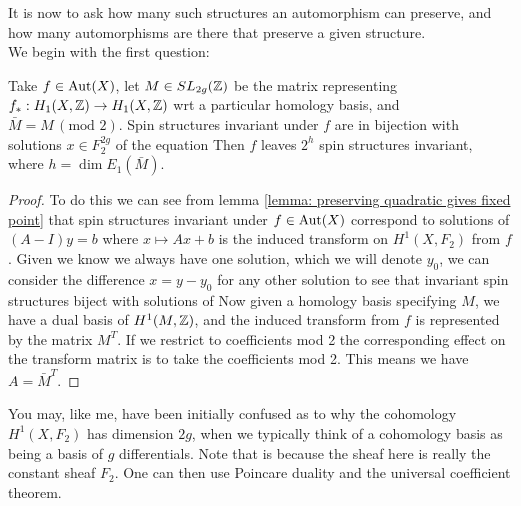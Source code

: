 \documentclass{article}
\begin{document}
It is now to ask how many such structures an automorphism can preserve, and how many automorphisms are there that preserve a given structure.\\
We begin with the first question:
\begin{theorem}
	Take $f \in \operatorname{Aut}(X)$, let $M \in SL_{2g}(\mathbb{Z})$ be the matrix representing $f_\ast : H_1(X,\mathbb{Z}) \to H_1(X, \mathbb{Z})$ wrt a particular homology basis, and $\bar{M}=M \, (\text{mod }2)$. Spin structures invariant under $f$ are in bijection with solutions $x \in F_2^{2g}$ of the equation 
Then $f$ leaves $2^h$ spin structures invariant, where $h = \dim E_1(\bar{M})$. 
\end{theorem}
\begin{proof}
 To do this we can see from lemma \ref{lemma: preserving quadratic gives fixed point} that spin structures invariant under $f \in \operatorname{Aut}(X)$ correspond to solutions of $(A-I)y=b$ where $x \mapsto Ax+b$ is the induced transform on $H^1(X,F_2)$ from $f$. Given we know we always have one solution, which we will denote $y_0$, we can consider the difference $x=y-y_0$ for any other solution to see that invariant spin structures biject with solutions of 
Now given a homology basis specifying $M$, we have a dual basis of $H^1(M,\mathbb{Z})$, and the induced transform from $f$ is represented by the matrix $M^T$. If we restrict to coefficients mod 2 the corresponding effect on the transform matrix is to take the coefficients mod 2. This means we have $A = \bar{M}^T$. 
\end{proof}
\begin{remark}
	You may, like me, have been initially confused as to why the cohomology $H^1(X,F_2)$ has dimension $2g$, when we typically think of a cohomology basis as being a basis of $g$ differentials. Note that is because the sheaf here is really the constant sheaf $F_2$. One can then use Poincare duality and the universal coefficient theorem.
\end{remark} 
\end{document}
